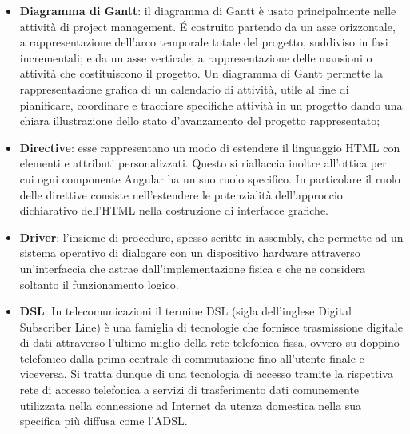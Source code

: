 \begin{itemize}
\begin{itemize}
	\end{itemize}
	\item
	\textbf{Diagramma di Gantt}: il diagramma di Gantt è usato principalmente nelle attività di project management. \'E costruito partendo da un asse orizzontale, a rappresentazione dell'arco temporale totale del progetto, suddiviso in fasi incrementali; e da un asse verticale, a rappresentazione delle mansioni o attività che costituiscono il progetto.
	Un diagramma di Gantt permette la rappresentazione grafica di un calendario di attività, utile al fine di pianificare, coordinare e tracciare specifiche attività in un progetto dando una chiara illustrazione dello stato d'avanzamento del progetto rappresentato;
	\item
	\textbf{Directive}: esse rappresentano un modo di estendere il linguaggio HTML con elementi e attributi personalizzati. Questo si riallaccia inoltre all’ottica per cui ogni componente Angular ha un suo ruolo specifico. In particolare il ruolo delle direttive consiste nell’estendere le potenzialità dell’approccio dichiarativo dell’HTML nella costruzione di interfacce grafiche.
	\item
	\textbf{Driver}: l'insieme di procedure, spesso scritte in assembly, che permette ad un sistema operativo di dialogare con un dispositivo hardware attraverso un'interfaccia che astrae dall'implementazione fisica e che ne considera soltanto il funzionamento logico.
	\item
	\textbf{DSL}: In telecomunicazioni il termine DSL (sigla dell'inglese Digital Subscriber Line) è una famiglia di tecnologie che fornisce trasmissione digitale di dati attraverso l'ultimo miglio della rete telefonica fissa, ovvero su doppino telefonico dalla prima centrale di commutazione fino all'utente finale e viceversa.
	Si tratta dunque di una tecnologia di accesso tramite la rispettiva rete di accesso telefonica a servizi di trasferimento dati comunemente utilizzata nella connessione ad Internet da utenza domestica nella sua specifica più diffusa come l'ADSL. 
\end{itemize}